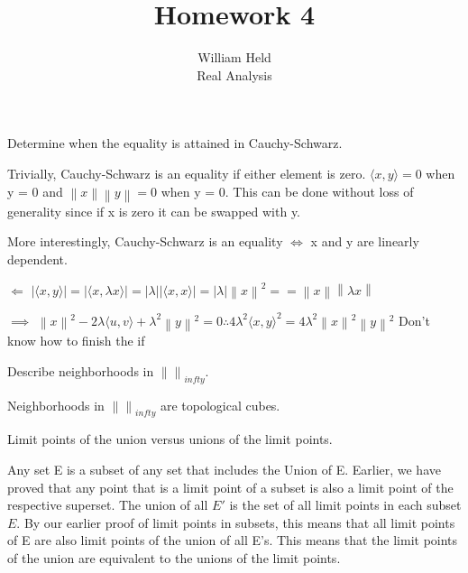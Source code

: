 \documentclass[12pt]{article}
\newenvironment{exercise}[2][Exercise]{\begin{trivlist}
\item[\hskip \labelsep {\bfseries #1}\hskip \labelsep {\bfseries #2.}]}{\end{trivlist}}
\begin{document}
 
 
 
\title{Homework 4}%
\author{William Held\\ %
Real Analysis} %

\newcommand{\norm}[1]{\left\lVert#1\right\rVert}
\newcommand{\abs}[1]{|#1|}
\let\biconditional\leftrightarrow
\maketitle
\begin{exercise}{1.1}
 Determine when the equality is attained in Cauchy-Schwarz.
\end{exercise}
Trivially, Cauchy-Schwarz is an equality if either element is zero. $\langle x, y \rangle = 0$ when y = 0 and $\norm{x}\norm{y} = 0$ when y = 0. This can be done without loss of generality since if x is zero it can be swapped with y.

More interestingly, Cauchy-Schwarz is an equality $\iff$ x and y are linearly dependent. 

$\Leftarrow$ $\abs{\langle x, y \rangle} = \abs{\langle x, \lambda x \rangle} = \abs{\lambda} \abs{\langle x, x \rangle} = \abs{\lambda} \norm{x}^2 == \norm{x} \norm{\lambda x}$

$\implies$ $\norm{x}^2 - 2\lambda\langle u,v \rangle + \lambda^2\norm{y}^2 = 0 \therefore 4\lambda^2\langle x,y \rangle^2 = 4\lambda^2\norm{x}^2\norm{y}^2$ Don't know how to finish the if
\begin{exercise}{1.2}
Describe neighborhoods in $\norm{}_{infty}$.
\end{exercise}
Neighborhoods in $\norm{}_{infty}$ are topological cubes.

\begin{exercise}{1.3}
Limit points of the union versus unions of the limit points.
\end{exercise}

Any set E is a subset of any set that includes the Union of E. Earlier, we have proved that any point that is a limit point of a subset is also a limit point of the respective superset. The union of all $E\prime$ is the set of all limit points in each subset $E$. By our earlier proof of limit points in subsets, this means that all limit points of E are also limit points of the union of all E's. This means that the limit points of the union are equivalent to the unions of the limit points.
\end{document}
